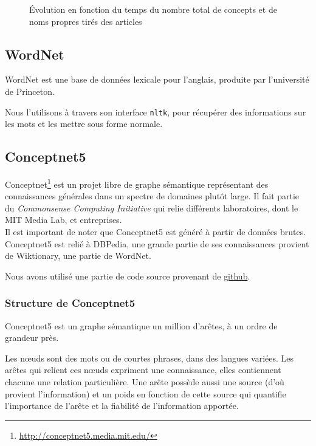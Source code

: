 \documentclass[a4paper, 12pt]{article}
\newcommand{\pyt}[1]{\texttt{#1}}%
\newcommand{\ang}[1]{\textit{#1}}%
\begin{document}
\begin{figure}[h]
 \centering
 \caption{\label{fig:conceptsnoms}Évolution en fonction du temps du nombre total de concepts et de noms propres tirés des articles}
\end{figure}



\subsection{WordNet}\label{Subsection:WordNet}

WordNet est une base de données lexicale pour l'anglais, produite par l'université de Princeton.

Nous l'utilisons à travers son interface \pyt{nltk}, pour récupérer des informations sur les mots et les mettre sous forme normale.


\subsection{Conceptnet5}\label{Subsection:Conceptnet5}

Conceptnet\footnote{\href{http://conceptnet5.media.mit.edu/}{http://conceptnet5.media.mit.edu/}} est un projet libre de graphe sémantique représentant des connaissances générales dans un spectre de domaines plutôt large. Il fait partie du \ang{Commonsense Computing Initiative} qui relie différents laboratoires, dont le MIT Media Lab, et entreprises.\\

Il est important de noter que Conceptnet5 est généré à partir de données brutes. Conceptnet5 est relié à DBPedia, une grande partie de ses connaissances provient de Wiktionary, une partie de WordNet.

Nous avons utilisé une partie de code source provenant de \href{https://github.com/commonsense/conceptnet5}{github}.


\subsubsection{Structure de Conceptnet5}

Conceptnet5 est un graphe sémantique un million d'arêtes, à un ordre de grandeur près.

Les n\oe{}uds sont des mots ou de courtes phrases, dans des langues variées. Les arêtes qui relient ces n\oe{}uds expriment une connaissance, elles contiennent chacune une relation particulière.
Une arête possède aussi une source (d'où provient l'information) et un poids en fonction de cette source qui quantifie l'importance de l'arête et la fiabilité de l'information apportée.
\end{document}
